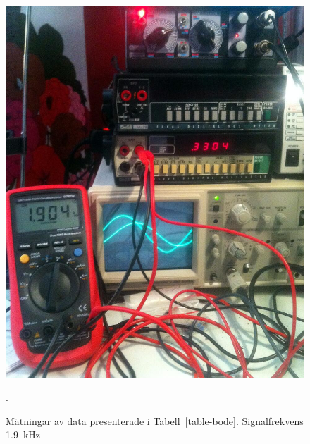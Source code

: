 \begin{figure}\label{fig:bode-foto-1900}
  \centering
  \includegraphics[width=\linewidth]{img/bode_1900Hz.jpg}
  \caption[] {Mätningar av data presenterade i Tabell~\ref{table-bode}.
              Signalfrekvens \SI{1.9}{\kHz}}.
\end{figure}

